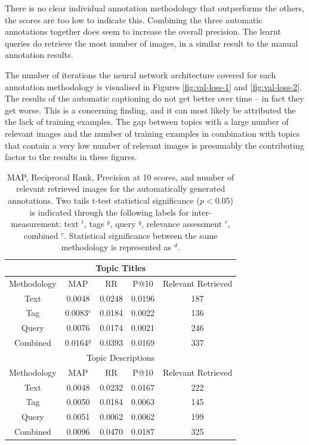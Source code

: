There is no clear individual annotation methodology that outperforms the others, the scores are too low to indicate this. Combining the three automatic annotations together does seem to increase the overall precision. The learnt queries do retrieve the most number of images, in a similar result to the manual annotation results.

The number of iterations the neural network architecture covered for each annotation methodology is visualised in Figures \ref{fig:val-loss-1} and \ref{fig:val-loss-2}. The results of the automatic captioning do not get better over time -- in fact they get worse. This is a concerning finding, and it can most likely be attributed the the lack of training examples. The gap between topics with a large number of relevant images and the number of training examples in combination with topics that contain a very low number of relevant images is presumably the contributing factor to the results in these figures.

\begin{table}[ht]
    \centering
    \begin{tabular}{|c|c|c|c|c|}
        \multicolumn{5}{c}{Topic Titles}\\ \hline
         Methodology & MAP & RR & P@10 & Relevant Retrieved\\ \hline
         Text & 0.0048 & 0.0248 & 0.0196 & 187 \\ \hline
         Tag & 0.0083$^{c}$ & 0.0184 & 0.0022 & 136 \\ \hline
         Query & 0.0076 & 0.0174 & 0.0021 & 246 \\ \hline
         Combined & 0.0164$^{g}$ & 0.0393 & 0.0169 & 337 \\ \hline
        \multicolumn{5}{c}{Topic Descriptions}\\ \hline
         Methodology & MAP & RR & P@10 & Relevant Retrieved\\ \hline
         Text & 0.0048 & 0.0232 & 0.0167 & 222 \\ \hline
         Tag & 0.0050 & 0.0184 & 0.0063 & 145 \\ \hline
         Query & 0.0051 & 0.0062 & 0.0062 & 199 \\ \hline
         Combined & 0.0096 & 0.0470 & 0.0187 & 325 \\ \hline
    \end{tabular}
    \caption{MAP, Reciprocal Rank, Precision at 10 scores, and number of relevant retrieved images for the automatically generated annotations. Two tails t-test statistical significance ($p<0.05$) is indicated through the following labels for inter-measurement: text $^t$, tags $^g$, query $^q$, relevance assessment $^r$, combined $^c$. Statistical significance between the same methodology is represented as $^d$.}
    \label{table:learnt-results}
\end{table}

